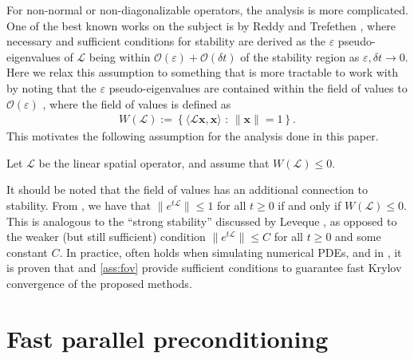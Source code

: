 \documentclass[review]{siamart}
\begin{document}
For non-normal or non-diagonalizable operators, the analysis is more complicated.
One of the best known works on the subject is by Reddy and Trefethen \cite{reddy92},
where necessary and sufficient conditions for stability are derived as the
$\varepsilon$ pseudo-eigenvalues of $\mathcal{L}$ being within
$\mathcal{O}(\varepsilon) + \mathcal{O}(\delta t)$ of the stability region
as $\varepsilon,\delta t\to 0$. Here we relax this assumption to something
that is more tractable to work with by noting that the $\varepsilon$
pseudo-eigenvalues are contained within the field of values to
$\mathcal{O}(\varepsilon)$ \cite[Eq. (17.9)]{trefethen2005spectra},
where the field of values is defined as
%
\begin{align}\label{eq:fov}
W(\mathcal{L}) := \left\{ \langle \mathcal{L}\mathbf{x},\mathbf{x}\rangle \text{ : }
	\|\mathbf{x}\| = 1 \right\}.
\end{align}
%
This motivates the following assumption for the analysis done in this paper.
%
\begin{assumption}\label{ass:fov}
Let $\mathcal{L}$ be the linear spatial operator, and assume that $W(\mathcal{L}) \leq 0$.
\end{assumption}
%
It should be noted that the field of values has an additional connection
to stability. From \cite[Theorem 17.1]{trefethen2005spectra}, we have that
$\|e^{t\mathcal{L}}\|\leq 1$ for all $t\geq 0$ if and only if $W(\mathcal{L}) \leq 0$.
This is analogous to the ``strong stability'' discussed by Leveque
\cite[Chapter 9.5]{leveque2007finite}, as opposed to the weaker (but still
sufficient) condition $\|e^{t\mathcal{L}}\|\leq C$ for all $t\geq 0$ and
some constant $C$. In practice,  often holds when
simulating numerical PDEs, and in , it is proven that
 and \ref{ass:fov} provide sufficient conditions to guarantee
fast Krylov convergence of the proposed methods.

\section{Fast parallel preconditioning}\label{sec:solve}
\end{document}
